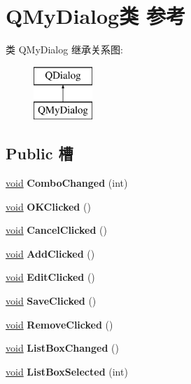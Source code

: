 \hypertarget{class_q_my_dialog}{}\section{Q\+My\+Dialog类 参考}
\label{class_q_my_dialog}
类 Q\+My\+Dialog 继承关系图\+:\begin{figure}[H]
\begin{center}
\leavevmode
\includegraphics[height=2.000000cm]{class_q_my_dialog}
\end{center}
\end{figure}
\subsection*{Public 槽}
\begin{DoxyCompactItemize}
\item 
\mbox{\label{class_q_my_dialog_a3f155893458aa7f5d7391f9e13772c17}} 
\hyperlink{interfacevoid}{void} {\bfseries Combo\+Changed} (int)
\item 
\mbox{\label{class_q_my_dialog_a3e73cb8ff1abe94d8ecd2522d4b7bc04}} 
\hyperlink{interfacevoid}{void} {\bfseries O\+K\+Clicked} ()
\item 
\mbox{\label{class_q_my_dialog_a9dd8728061b361c1cb68215da0ca77fe}} 
\hyperlink{interfacevoid}{void} {\bfseries Cancel\+Clicked} ()
\item 
\mbox{\label{class_q_my_dialog_a32d52d12ebb8026f56b471bd4030b09d}} 
\hyperlink{interfacevoid}{void} {\bfseries Add\+Clicked} ()
\item 
\mbox{\label{class_q_my_dialog_a2a02fb7072624bdb60c2b1300c939bed}} 
\hyperlink{interfacevoid}{void} {\bfseries Edit\+Clicked} ()
\item 
\mbox{\label{class_q_my_dialog_aeed67d4be5122fb2b178e26f2ed0e43f}} 
\hyperlink{interfacevoid}{void} {\bfseries Save\+Clicked} ()
\item 
\mbox{\label{class_q_my_dialog_ab0efcd1ebb94e92e33c26c7442d91220}} 
\hyperlink{interfacevoid}{void} {\bfseries Remove\+Clicked} ()
\item 
\mbox{\label{class_q_my_dialog_ac29f171b9c6dab798fb730513bea7083}} 
\hyperlink{interfacevoid}{void} {\bfseries List\+Box\+Changed} ()
\item 
\mbox{\label{class_q_my_dialog_a3f26ba80e1ad8f38c579d84054008464}} 
\hyperlink{interfacevoid}{void} {\bfseries List\+Box\+Selected} (int)
\end{DoxyCompactItemize}
